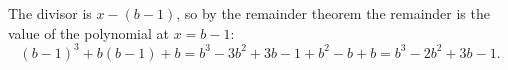 The divisor is $x-(b-1)$, so by the remainder theorem the remainder is the value of the polynomial at $x=b-1$:
\[
(b-1)^3+b(b-1)+b=b^3-3b^2+3b-1+b^2-b+b=\boxed{b^3-2b^2+3b-1}.
\]
